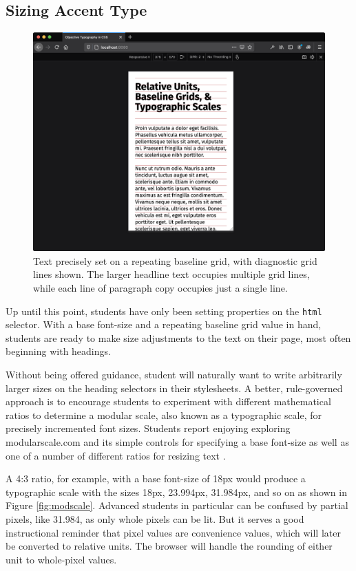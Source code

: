 \documentclass[sigplan,screen]{acmart}
\begin{document}
\subsection{Sizing Accent Type}

\begin{figure}
  \includegraphics[width=\linewidth]{rdv-narrow}
  \caption{Text precisely set on a repeating baseline grid, with diagnostic grid lines shown. The larger headline text occupies multiple grid lines, while each line of paragraph copy occupies just a single line.}
  \label{fig:rdv-narrow}
\end{figure}

Up until this point, students have only been setting properties on the \verb|html| selector. With a base font-size and a repeating baseline grid value in hand, students are ready to make size adjustments to the text on their page, most often beginning with headings.

Without being offered guidance, student will naturally want to write arbitrarily larger sizes on the heading selectors in their stylesheets. A better, rule-governed approach is to encourage students to experiment with different mathematical ratios to determine a modular scale, also known as a typographic scale, for precisely incremented font sizes. Students report enjoying exploring modularscale.com and its simple controls for specifying a base font-size as well as one of a number of different ratios for resizing text \cite{modscale}.

A 4:3 ratio, for example, with a base font-size of 18px would produce a typographic scale with the sizes 18px, 23.994px, 31.984px, and so on as shown in Figure \ref{fig:modscale}. Advanced students in particular can be confused by partial pixels, like 31.984, as only whole pixels can be lit. But it serves a good instructional reminder that pixel values are convenience values, which will later be converted to relative units. The browser will handle the rounding of either unit to whole-pixel values.
\end{document}
